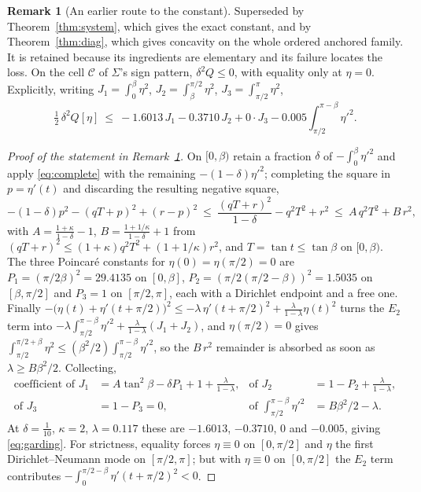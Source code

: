 \documentclass[11pt]{article}
\theoremstyle{definition}
\newtheorem{remark}[theorem]{Remark}
\newcommand{\Sig}{\Sigma}
\begin{document}
\begin{remark}[An earlier route to the constant]\label{thm:concave}
Superseded by Theorem~\ref{thm:system}, which gives the exact constant, and by
Theorem~\ref{thm:diag}, which gives concavity on the whole ordered anchored family. It is
retained because its ingredients are elementary and its failure locates the loss.
On the cell $\mathcal C$ of $\Sig$'s sign pattern, $\delta^2Q\le0$, with equality only
at $\eta=0$. Explicitly, writing $J_1=\int_0^\beta\eta^2$, $J_2=\int_\beta^{\pi/2}\eta^2$,
$J_3=\int_{\pi/2}^\pi\eta^2$,
\begin{equation}\label{eq:garding}
  \tfrac12\,\delta^2Q[\eta]\ \le\ -1.6013\,J_1-0.3710\,J_2+0\cdot J_3
     -0.005\int_{\pi/2}^{\pi-\beta}\eta'^2 .
\end{equation}
\end{remark}

\begin{proof}[Proof of the statement in Remark~\ref{thm:concave}]
On $[0,\beta)$ retain a fraction $\delta$ of $-\int_0^\beta\eta'^2$ and apply
\eqref{eq:complete} with the remaining $-(1-\delta)\eta'^2$; completing the square in
$p=\eta'(t)$ and discarding the resulting negative square,
\[
  -(1-\delta)p^2-(qT+p)^2+(r-p)^2\ \le\
  \frac{(qT+r)^2}{1-\delta}-q^2T^2+r^2
  \ \le\ A\,q^2T^2+B\,r^2 ,
\]
with $A=\frac{1+\kappa}{1-\delta}-1$, $B=\frac{1+1/\kappa}{1-\delta}+1$ from
$(qT+r)^2\le(1+\kappa)q^2T^2+(1+1/\kappa)r^2$, and $T=\tan t\le\tan\beta$ on $[0,\beta)$.
The three Poincaré constants for $\eta(0)=\eta(\pi/2)=0$ are
$P_1=(\pi/2\beta)^2=29.4135$ on $[0,\beta]$, $P_2=(\pi/2(\pi/2-\beta))^2=1.5035$ on
$[\beta,\pi/2]$ and $P_3=1$ on $[\pi/2,\pi]$, each with a Dirichlet endpoint and a free
one. Finally $-\bigl(\eta(t)+\eta'(t+\pi/2)\bigr)^2\le-\lambda\,\eta'(t+\pi/2)^2
+\tfrac{\lambda}{1-\lambda}\eta(t)^2$ turns the $E_2$ term into
$-\lambda\int_{\pi/2}^{\pi-\beta}\eta'^2+\tfrac{\lambda}{1-\lambda}(J_1+J_2)$, and
$\eta(\pi/2)=0$ gives
$\int_{\pi/2}^{\pi/2+\beta}\eta^2\le(\beta^2/2)\int_{\pi/2}^{\pi-\beta}\eta'^2$, so the
$B\,r^2$ remainder is absorbed as soon as $\lambda\ge B\beta^2/2$. Collecting,
\[
  \begin{aligned}
    \text{coefficient of }J_1&=A\tan^2\beta-\delta P_1+1+\tfrac{\lambda}{1-\lambda},&
    \text{of }J_2&=1-P_2+\tfrac{\lambda}{1-\lambda},\\
    \text{of }J_3&=1-P_3=0,&
    \text{of }\!\!\int_{\pi/2}^{\pi-\beta}\!\!\eta'^2&=B\beta^2/2-\lambda .
  \end{aligned}
\]
At $\delta=\tfrac1{10}$, $\kappa=2$, $\lambda=0.117$ these are $-1.6013$, $-0.3710$, $0$
and $-0.005$, giving \eqref{eq:garding}. For strictness, equality forces $\eta\equiv0$ on
$[0,\pi/2]$ and $\eta$ the first Dirichlet--Neumann mode on $[\pi/2,\pi]$; but with
$\eta\equiv0$ on $[0,\pi/2]$ the $E_2$ term contributes
$-\int_0^{\pi/2-\beta}\eta'(t+\pi/2)^2<0$.
\end{proof}
\end{document}
